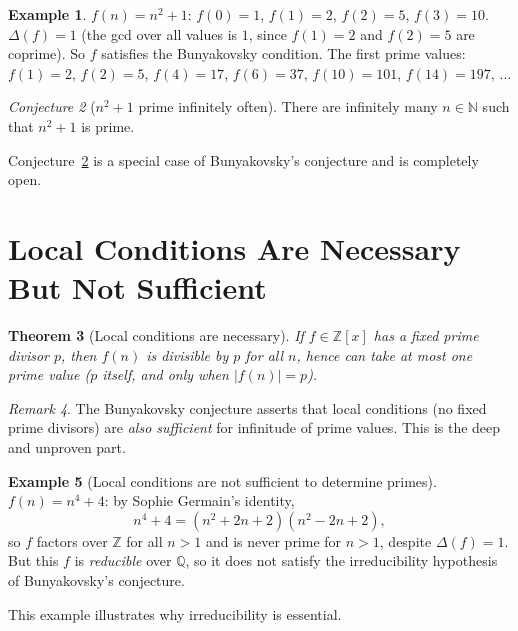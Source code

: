 \documentclass[12pt,a4paper]{amsart}
\newtheorem{theorem}{Theorem}[section]
\theoremstyle{definition}
\newtheorem{example}[theorem]{Example}
\theoremstyle{remark}
\newtheorem{remark}[theorem]{Remark}
\newtheorem{conjecture}[theorem]{Conjecture}
\newcommand{\N}{\mathbb{N}}
\newcommand{\Z}{\mathbb{Z}}
\newcommand{\Q}{\mathbb{Q}}
\begin{document}
\begin{example}
$f(n) = n^2 + 1$: $f(0) = 1$, $f(1) = 2$, $f(2) = 5$, $f(3) = 10$.
$\Delta(f) = 1$ (the gcd over all values is $1$, since $f(1) = 2$ and $f(2) = 5$ are
coprime). So $f$ satisfies the Bunyakovsky condition.
The first prime values: $f(1) = 2$, $f(2) = 5$, $f(4) = 17$, $f(6) = 37$,
$f(10) = 101$, $f(14) = 197$, $\ldots$
\end{example}

\begin{conjecture}[$n^2 + 1$ prime infinitely often]
\label{conj:nsq}
There are infinitely many $n \in \N$ such that $n^2 + 1$ is prime.
\end{conjecture}

Conjecture~\ref{conj:nsq} is a special case of Bunyakovsky's conjecture
and is completely open.

\section{Local Conditions Are Necessary But Not Sufficient}

\begin{theorem}[Local conditions are necessary]
If $f \in \Z[x]$ has a fixed prime divisor $p$, then $f(n)$ is divisible
by $p$ for all $n$, hence can take at most one prime value ($p$ itself, and
only when $|f(n)| = p$).
\end{theorem}

\begin{remark}
The Bunyakovsky conjecture asserts that local conditions (no fixed prime
divisors) are \emph{also sufficient} for infinitude of prime values.
This is the deep and unproven part.
\end{remark}

\begin{example}[Local conditions are not sufficient to determine primes]
$f(n) = n^4 + 4$: by Sophie Germain's identity,
\[
  n^4 + 4 = (n^2 + 2n + 2)(n^2 - 2n + 2),
\]
so $f$ factors over $\Z$ for all $n > 1$ and is never prime for $n > 1$,
despite $\Delta(f) = 1$.
But this $f$ is \emph{reducible} over $\Q$, so it does not satisfy the
irreducibility hypothesis of Bunyakovsky's conjecture.
\end{example}

This example illustrates why irreducibility is essential.

\end{document}
